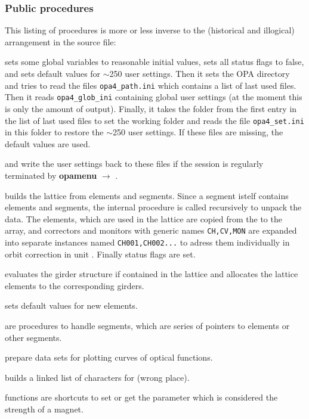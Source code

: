 \documentclass[12pt]{article}
\newcommand\code[1]{{\tt #1}}
\newcommand{\ofld}[1]{\colorbox{black!15}{{{\color{black}\bf #1}}}}
\newcommand\guico[1]{{\color{blue}\code{#1}}}
\newcommand{\unico}[1]{{\color{burntorange}\code{#1}}}
\newcommand{\evcod}[2]{\ofld{#1} $\rightarrow$ \guico{#2}}
\newcommand{\opagui}[1]{\colorbox{blue!20}{{\color{black}\code{#1}}}}
\newcommand{\ogui}[1]{\hyperref[#1]{\opagui{#1}}}
\newcommand{\ppro}[1]{\subsubsection*{Public procedures} #1}
\newcommand{\todo}[1]{{\color{red} #1}}
\begin{document}
\ppro{
This listing of procedures is more or less inverse to the (historical and illogical) arrangement in the source file:

\unico{Initialization} sets some global variables to reasonable initial values, sets all status flags to false, and sets default values for $\sim$250 user settings.
Then it sets the OPA directory and tries to read the files \code{opa4\_path.ini} which contains a list of last used files. Then it reads \code{opa4\_glob\_ini} containing global user settings (at the moment this is only the amount of output). Finally, it takes the folder from the first entry in the list of last used files to set the working folder and reads the file \code{opa4\_set.ini} in this folder to restore the $\sim$250 user settings. If these files are missing, the default values are used.

\unico{GlobDefWriteFile} and \unico{DefWriteFile} write the user settings back to these files if the session is regularly terminated by \evcod{opamenu}{ExitOPA}.

\unico{MakeLattice} builds the lattice from elements and segments. Since a segment istelf contains elements and segments, the internal procedure \unico{SegLat} is called recursively to unpack the data. 
The elements, which are used in the lattice are copied from the \unico{Elem} to the \unico{Ella} array, and correctors and monitors with generic names \code{CH,CV,MON}
are expanded into separate instances named \code{CH001,CH002...} to adress them individually in orbit correction in unit \ogui{opaorbit}. Finally status flags are set.

\unico{GirderSetup} evaluates the girder structure if contained in the lattice and allocates the lattice elements to the corresponding girders.

\unico{IniElem} sets default values for new elements.

\unico{AppendAE, ClearSeg, NAESeg} are procedures to handle segments, which are series of pointers to elements or other segments.

\unico{AppendCurve, ClearCurve}  prepare data sets for plotting curves of optical functions. 

\unico{AppendChar} builds a linked list of characters for \ogui{opatexteditor} \todo{(wrong place)}.

\unico{putkval, getkval, putSexkval, getSexkval} functions are shortcuts to set or get the parameter which is considered the strength of a magnet.

}
\end{document}
